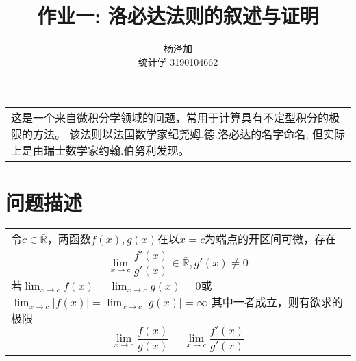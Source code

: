 \documentclass{ctexart}
\title{作业一: 洛必达法则的叙述与证明}
\author{杨泽加 \\ 统计学 3190104662}
\begin{document}
    \maketitle

    \begin{tabular}{p{}}
        这是一个来自微积分学领域的问题，常用于计算具有不定型积分的极限的方法。
        该法则以法国数学家纪尧姆.德.洛必达的名字命名,
        但实际上是由瑞士数学家约翰.伯努利发现。
    \end{tabular}


    \section{问题描述}
    \begin{tabular}{p{}}
        令$c\in \bar{\mathbb{R}}$，两函数$f(x),g(x)$在以$x=c$为端点的开区间可微，存在 \\
        \begin{equation}
            \lim_{x\rightarrow c}\frac{f'(x)}{g'(x)}\in\bar{\mathbb{R}},g'(x)\neq 0
            \label{declaration1}
        \end{equation}
        若$\lim_{x\rightarrow c}f(x) = \lim_{x\rightarrow c}g(x) = 0$或
        $\lim_{x\rightarrow c}|f(x)| = \lim_{x\rightarrow c}|g(x)| = \infty$
        其中一者成立，则有欲求的极限
        \begin{equation}
            \lim_{x\rightarrow c}\frac{f(x)}{g(x)} =
            \lim_{x\rightarrow c}\frac{f'(x)}{g'(x)}
            \label{declaration2}
        \end{equation}
    \end{tabular}
\end{document}
